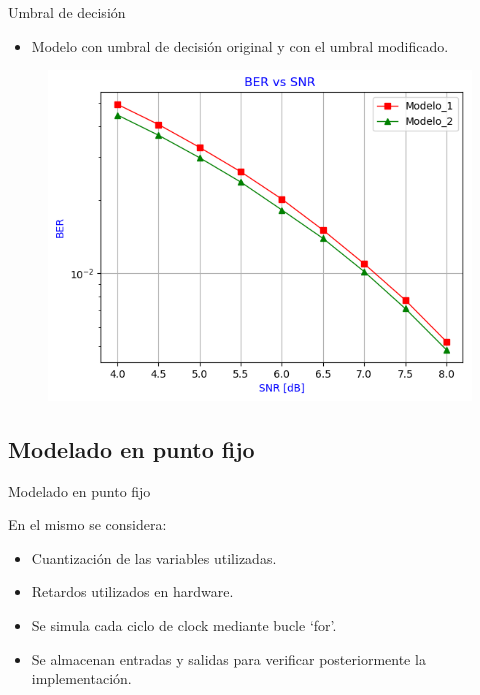 \documentclass[xcolor=table]{beamer}
\begin{document}
\begin{frame}{Umbral de decisión}
\begin{itemize}
    \item Modelo con umbral de decisión original y con el umbral modificado.
\end{itemize}

 \begin{figure}
  \centering
  \includegraphics[width=0.70\paperwidth]{Graficos/BER_vs_SNR_9.png}%
\end{figure}
\end{frame}

\subsection{Modelado en punto fijo}
\begin{frame}{Modelado en punto fijo}

En el mismo se considera:

\begin{itemize}
    \item Cuantización de las variables utilizadas.
    \item Retardos utilizados en hardware.
    \item Se simula cada ciclo de clock mediante bucle `for'.
    \item Se almacenan entradas y salidas para verificar posteriormente la implementación. 
\end{itemize}
\end{frame}
\end{document}
